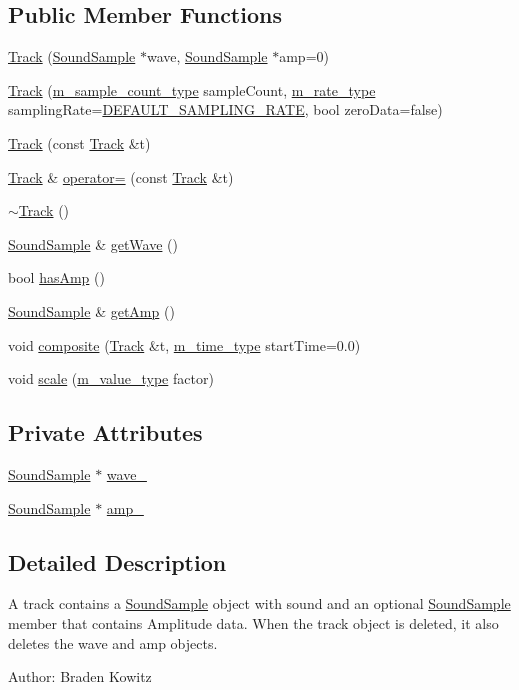 \subsection*{Public Member Functions}
\begin{CompactItemize}
\item 
\hyperlink{classTrack_a0}{Track} (\hyperlink{classSoundSample}{Sound\-Sample} $\ast$wave, \hyperlink{classSoundSample}{Sound\-Sample} $\ast$amp=0)
\item 
\hyperlink{classTrack_a1}{Track} (\hyperlink{Types_8h_a1}{m\_\-sample\_\-count\_\-type} sample\-Count, \hyperlink{Types_8h_a4}{m\_\-rate\_\-type} sampling\-Rate=\hyperlink{Types_8h_a5}{DEFAULT\_\-SAMPLING\_\-RATE}, bool zero\-Data=false)
\item 
\hyperlink{classTrack_a2}{Track} (const  \hyperlink{classTrack}{Track} \&t)
\item 
\hyperlink{classTrack}{Track} \& \hyperlink{classTrack_a3}{operator=} (const  \hyperlink{classTrack}{Track} \&t)
\item 
\hyperlink{classTrack_a4}{$\sim$Track} ()
\item 
\hyperlink{classSoundSample}{Sound\-Sample} \& \hyperlink{classTrack_a5}{get\-Wave} ()
\item 
bool \hyperlink{classTrack_a6}{has\-Amp} ()
\item 
\hyperlink{classSoundSample}{Sound\-Sample} \& \hyperlink{classTrack_a7}{get\-Amp} ()
\item 
void \hyperlink{classTrack_a8}{composite} (\hyperlink{classTrack}{Track} \&t, \hyperlink{Types_8h_a2}{m\_\-time\_\-type} start\-Time=0.0)
\item 
void \hyperlink{classTrack_a9}{scale} (\hyperlink{Types_8h_a3}{m\_\-value\_\-type} factor)
\end{CompactItemize}
\subsection*{Private Attributes}
\begin{CompactItemize}
\item 
\hyperlink{classSoundSample}{Sound\-Sample} $\ast$ \hyperlink{classTrack_r0}{wave\_\-}
\item 
\hyperlink{classSoundSample}{Sound\-Sample} $\ast$ \hyperlink{classTrack_r1}{amp\_\-}
\end{CompactItemize}


\subsection{Detailed Description}
A track contains a \hyperlink{classSoundSample}{Sound\-Sample} object with sound and an optional \hyperlink{classSoundSample}{Sound\-Sample} member that contains Amplitude data. When the track object is deleted, it also deletes the wave and amp objects. \begin{Desc}
\item[Author:]Braden Kowitz \end{Desc}




